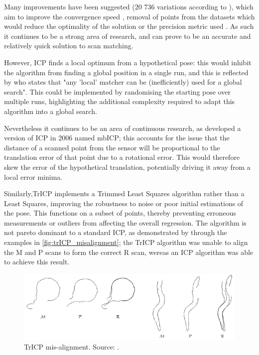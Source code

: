 \documentclass[authoryearcitations]{UoYCSproject}
\begin{document}
Many improvements have been suggested (20 736 variations according to \citet{Donoso2017-wp}), which aim to improve the convergence speed \cite{Donoso2017-wp} \cite{Simon1996-dl}, removal of points from the datasets which would reduce the optimality of the solution \cite{Weik1997-px} \cite{Masuda1996-av} or the precision metric used \cite{Eggert1997-ak}. As such it continues to be a strong area of research, and can prove to be an accurate and relatively quick solution to scan matching.

However, ICP finds a local optimum from a hypothetical pose: this would inhibit the algorithm from finding a global position in a single run, and this is reflected by \citet{Censi2005-iv} who states that "any 'local' matcher can be (inefficiently) used for a global search". This could be implemented by randomising the starting pose over multiple runs, highlighting the additional complexity required to adapt this algorithm into a global search.

Nevertheless it continues to be an area of continuous research, as \citet{Minguez2006-nj} developed a version of ICP in 2006 named mbICP;  this accounts for the issue that the distance of a scanned point from the sensor will be proportional to the translation error of that point due to a rotational error. This would therefore skew the error of the hypothetical translation, potentially driving it away from a local error minima.

Similarly,TrICP \cite{Chetverikov2005-yz} implements a Trimmed Least Squares \cite{Ruppert1980-js} algorithm rather than a Least Squares, improving the robustness to noise or poor initial estimations of the pose. This functions on a subset of points, thereby preventing erroneous measurements or outliers from affecting the overall regression. The algorithm is not pareto dominant to a standard ICP, as demonstrated by \citeauthor{Chetverikov2005-yz} through the examples in \autoref{fig:trICP_misalignment}; the TrICP algorithm was unable to align the M and P scans to form the correct R scan, wereas an ICP algorithm was able to achieve this result. 


\begin{figure}[t]
	\centering
	\includegraphics[width=\textwidth,keepaspectratio]{images/trICP_misalignment.png}
	\caption{TrICP mis-alignment. Source: \citet{Chetverikov2005-yz}.}
	\label{fig:trICP_misalignment}
\end{figure}
\end{document}
